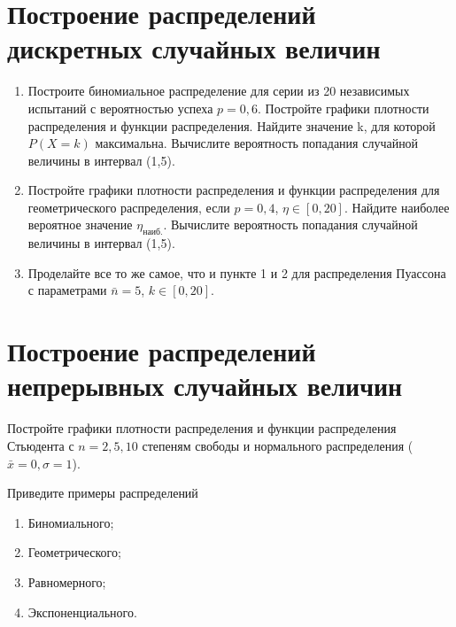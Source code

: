 \documentclass[14pt,a4paper]{article}
\begin{document}
\section{Построение распределений дискретных случайных величин}
\noindent\begin{enumerate}
	\item Построите биномиальное распределение для серии из 20 независимых испытаний с вероятностью успеха $p = 0,6$. Постройте графики плотности распределения и функции распределения. Найдите значение k, для которой $P(X=k)$ максимальна. Вычислите вероятность попадания случайной величины в интервал (1,5).
	\item Постройте графики плотности распределения и функции распределения для геометрического распределения, если $p=0,4$,  $\eta \in [0,20]$. Найдите наиболее вероятное значение $\eta_\text{наиб.}$. Вычислите вероятность попадания случайной величины в интервал (1,5).
	\item Проделайте все то же самое, что и пункте 1 и 2 для распределения Пуассона с параметрами $\bar{n}=5$, $k \in [0,20]$. 
\end{enumerate}

\section{Построение распределений непрерывных случайных величин}
Постройте графики плотности распределения и функции распределения Стьюдента с $n = 2, 5, 10$ степеням свободы и нормального распределения ($\bar{x} = 0, \sigma=1$). 

\questions{}
Приведите примеры распределений
\begin{enumerate}
	\item Биномиального;
	\item Геометрического;
	\item Равномерного;
	\item Экспоненциального.
\end{enumerate}

\nocite{Plis2003, Krestlev2010,MathCADshortcuts,Ochkov2016}
\printbibliography[title={Рекомендуемая литература}]
\end{document}
